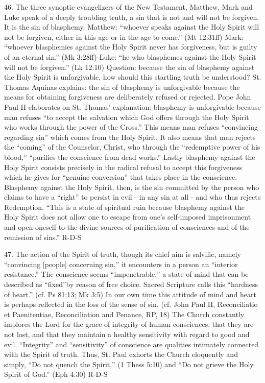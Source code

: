\documentclass[oneside]{book}
\begin{document}
46. The three synoptic evangelizers of the New Testament, Matthew, Mark and Luke
speak of a deeply troubling truth, a sin that is not and will not be
forgiven. It is the sin of blasphemy. Matthew: ``whoever speaks against the Holy
Spirit will not be forgiven, either in this age or in the age to come.'' (Mt
12:31ff) Mark: ``whoever blasphemies against the Holy Spirit never has
forgiveness, but is guilty of an eternal sin.'' (Mk 3:28ff) Luke: ``he who
blasphemes against the Holy Spirit will not be forgiven.'' (Lk 12:10) Question:
because the sin of blasphemy against the Holy Spirit is unforgivable, how should
this startling truth be understood? St. Thomas Aquinas explains: the sin of
blasphemy is unforgivable because the means for obtaining forgiveness are
deliberately refused or rejected. Pope John Paul II elaborates on St. Thomas'
explanation: blasphemy is unforgivable because man refuses ``to accept the
salvation which God offers through the Holy Spirit who works through the power
of the Cross.'' This means man refuses ``convincing regarding sin'' which comes
from the Holy Spirit. It also means that man rejects the ``coming'' of the
Counselor, Christ, who through the ``redemptive power of his blood,'' ``purifies
the conscience from dead works.'' Lastly blasphemy against the Holy Spirit
consists precisely in the radical refusal to accept this forgiveness which he
gives for ``genuine conversion'' that takes place in the conscience. Blasphemy
against the Holy Spirit, then, is the sin committed by the person who claims to
have a ``right'' to persist in evil - in any sin at all - and who thus rejects
Redemption. ``This is a state of spiritual ruin because blasphemy against the
Holy Spirit does not allow one to escape from one's self-imposed imprisonment
and open oneself to the divine sources of purification of consciences and of the
remission of sins.''
R-D-S

47. The action of the Spirit of truth, though its chief aim is salvific, namely
``convincing [people] concerning sin,'' it encounters in a person an ``interior
resistance.'' The conscience seems ``impenetrable,'' a state of mind that can be
described as ``fixed''by reason of free choice. Sacred Scripture calls this
``hardness of heart.'' (cf. Ps 81:13; Mk 3:5) In our own time this attitude of
mind and heart is perhaps reflected in the loss of the sense of sin. (cf. John
Paul II, Reconciliatio et Paenitentiae, Reconciliation and Penance, RP, 18) The
Church constantly implores the Lord for the grace of integrity of human
consciences, that they are not lost, and that they maintain a healthy
sensitivity with regard to good and evil. ``Integrity'' and ``sensitivity'' of
conscience are qualities intimately connected with the Spirit of truth. Thus,
St. Paul exhorts the Church eloquently and simply, ``Do not quench the Spirit,''
(1 Thess 5:10) and ``Do not grieve the Holy Spirit of God.'' (Eph 4:30)
R-D-S
\end{document}
